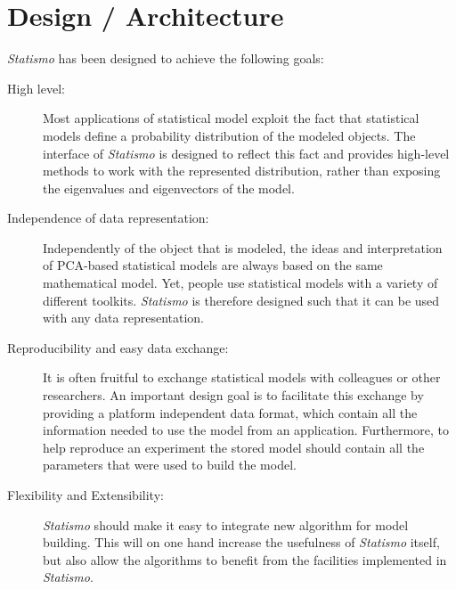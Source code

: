 \documentclass{InsightArticle}
\newcommand{\Statismo}{\emph{Statismo}\xspace}
\begin{document}
\section{Design / Architecture}
\Statismo has been designed to achieve the following goals:
\begin{description}
\item[High level:] Most applications of statistical model exploit the
  fact that statistical models define a probability distribution of
  the modeled objects. The interface of \Statismo is designed to reflect this fact and provides
  high-level methods to work with the represented distribution, rather than 
  exposing the eigenvalues and eigenvectors of the model. 
\item[Independence of data representation:] Independently of the
  object that is modeled, the ideas and interpretation of PCA-based
  statistical models are always based on the same mathematical model.
  Yet, people use statistical models with a variety of different
  toolkits. \Statismo is therefore designed such that it can be used with 
  any data representation. 
\item[Reproducibility and easy data exchange:] 
  It is often fruitful to exchange statistical models with colleagues or other researchers. 
  An important design goal is to facilitate this exchange by providing a platform independent data format, 
  which contain all the information needed to use the model from an application. 
  Furthermore, to help reproduce an experiment the stored model should contain all the parameters
  that were used to build the model. 
\item[Flexibility and Extensibility:] 
  \Statismo should make it easy to integrate new algorithm for model building. 
  This will on one hand increase the usefulness of \Statismo itself, but also 
  allow the algorithms to benefit from the facilities implemented in \Statismo. 
\end{description}
\end{document}
